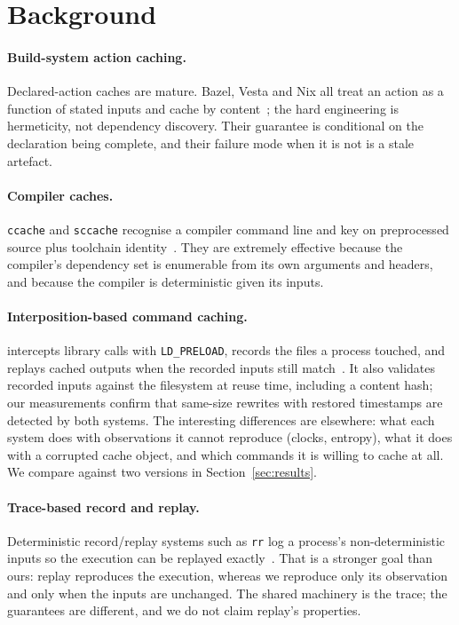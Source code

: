 \section{Background}

\paragraph{Build-system action caching.}
Declared-action caches are mature. Bazel, Vesta and Nix all treat an action as a function of
stated inputs and cache by content~\cite{bazel,vesta,nixos}; the hard engineering is hermeticity,
not dependency discovery. Their guarantee is conditional on the declaration being complete, and
their failure mode when it is not is a stale artefact.

\paragraph{Compiler caches.}
\texttt{ccache} and \texttt{sccache} recognise a compiler command line and key on preprocessed
source plus toolchain identity~\cite{ccache,sccache}. They are extremely effective because the
compiler's dependency set is enumerable from its own arguments and headers, and because the
compiler is deterministic given its inputs.

\paragraph{Interposition-based command caching.}
\firebuild{} intercepts library calls with \texttt{LD\_PRELOAD}, records the files a process
touched, and replays cached outputs when the recorded inputs still match~\cite{firebuild}. It also
validates recorded inputs against the filesystem at reuse time, including a content hash; our
measurements confirm that same-size rewrites with restored timestamps are detected by both systems.
The interesting differences are elsewhere: what each system does with observations it cannot
reproduce (clocks, entropy), what it does with a corrupted cache object, and which commands it is
willing to cache at all. We compare against two \firebuild{} versions in
Section~\ref{sec:results}.

\paragraph{Trace-based record and replay.}
Deterministic record/replay systems such as \texttt{rr} log a process's non-deterministic inputs so
the execution can be replayed exactly~\cite{rr}. That is a stronger goal than ours: replay
reproduces the execution, whereas we reproduce only its observation and only when the inputs are
unchanged. The shared machinery is the trace; the guarantees are different, and we do not claim
replay's properties.

